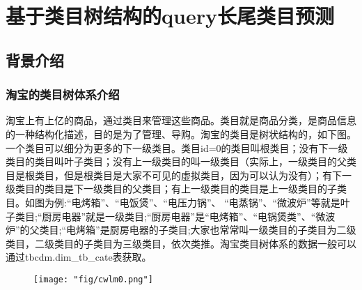 \section{基于类目树结构的query长尾类目预测}
\subsection{背景介绍}
\subsubsection{淘宝的类目树体系介绍}
淘宝上有上亿的商品，通过类目来管理这些商品。类目就是商品分类，是商品信息的一种结构化描述，目的是为了管理、导购。淘宝的类目是树状结构的，如下图。一个类目可以细分为更多的下一级类目。类目id=0的类目叫根类目；没有下一级类目的类目叫叶子类目；没有上一级类目的叫一级类目（实际上，一级类目的父类目是根类目，但是根类目是大家不可见的虚拟类目，因为可以认为没有）；有下一级类目的类目是下一级类目的父类目；有上一级类目的类目是上一级类目的子类目。如图为例:“电烤箱”、“电饭煲”、“电压力锅”、 “电蒸锅”、“微波炉”等就是叶子类目;“厨房电器”就是一级类目;“厨房电器”是“电烤箱”、“电锅煲类”、“微波炉”的父类目;“电烤箱”是厨房电器的子类目;大家也常常叫一级类目的子类目为二级类目，二级类目的子类目为三级类目，依次类推。淘宝类目树体系的数据一般可以通过tbcdm.dim\_tb\_cate表获取。
\begin{figure}[!h]
	\centering
	\texttt{[image: "fig/cwlm0.png"]}
	\caption{}
	\label{fig:cwlm0}
\end{figure}
